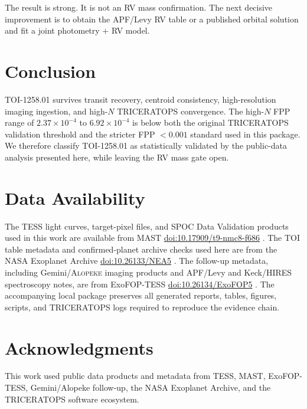 \documentclass[11pt]{article}
\begin{document}
The result is strong. It is not an RV mass confirmation. The next decisive improvement is to obtain the APF/Levy RV table or a published orbital solution and fit a joint photometry + RV model.

\section{Conclusion}
TOI-1258.01 survives transit recovery, centroid consistency, high-resolution imaging ingestion, and high-$N$ TRICERATOPS convergence. The high-$N$ FPP range of $2.37\times10^{-4}$ to $6.92\times10^{-4}$ is below both the original TRICERATOPS validation threshold and the stricter FPP $<0.001$ standard used in this package. We therefore classify TOI-1258.01 as statistically validated by the public-data analysis presented here, while leaving the RV mass gate open.

\section*{Data Availability}
The TESS light curves, target-pixel files, and SPOC Data Validation products
used in this work are available from MAST
\href{https://doi.org/10.17909/t9-nmc8-f686}{doi:10.17909/t9-nmc8-f686}
\cite{MAST}. The TOI table metadata and confirmed-planet archive checks used
here are from the NASA Exoplanet Archive
\href{https://doi.org/10.26133/NEA5}{doi:10.26133/NEA5}
\cite{ExoplanetArchive}. The follow-up metadata, including Gemini/\textsc{Alopeke}
imaging products and APF/Levy and Keck/HIRES spectroscopy notes, are from
ExoFOP-TESS \href{https://doi.org/10.26134/ExoFOP5}{doi:10.26134/ExoFOP5}
\cite{ExoFOPTESS}. The accompanying local package preserves all generated
reports, tables, figures, scripts, and TRICERATOPS logs required to reproduce
the evidence chain.

\section*{Acknowledgments}
This work used public data products and metadata from TESS, MAST, ExoFOP-TESS, Gemini/Alopeke follow-up, the NASA Exoplanet Archive, and the TRICERATOPS software ecosystem.



\end{document}
